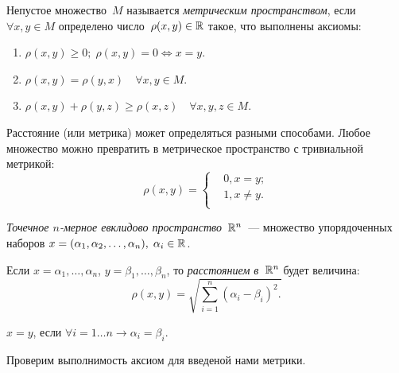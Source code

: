 \setcounter{section}{8}

\begin{definition}
Непустое множество~\(M\) называется \textit{метрическим пространством}, если \(\forall x, y \in M\)
определено число~\(\rho(x, y) \in \mathbb{R}\) такое, что выполнены аксиомы:
\begin{enumerate}
\item \(\rho(x, y) \geq 0; \; \rho(x, y) = 0 \Longleftrightarrow x = y\).
\item \(\rho(x, y) = \rho(y, x) \quad \forall x, y \in M\).
\item \(\rho(x, y) + \rho(y, z) \geq \rho(x, z) \quad \forall x, y, z \in M\).
\end{enumerate}
\end{definition}

\begin{note}
Расстояние (или метрика) может определяться разными способами. Любое множество можно превратить в
метрическое пространство с тривиальной метрикой:
\[
    \rho(x, y) = \left\{
        \begin{aligned}
            & 0, x = y;\\
            & 1, x \neq y.\\
        \end{aligned}
    \right .\]
\end{note}

\begin{definition}
\textit{Точечное \(n\)-мерное евклидово пространство~\(\mathbb{R}^n\)}~--- множество упорядоченных наборов
\(x = (\alpha_1, \alpha_2, \dots, \alpha_n), \; \alpha_i \in \mathbb{R}\).
\end{definition}

\begin{definition}
Если \(x = \alpha_1, \dots, \alpha_n\), \(y = \beta_1, \dots, \beta_n\), то \textit{расстоянием
в~\(\mathbb{R}^n\)} будет величина:
\[
    \rho(x, y) = \sqrt{\sum_{i=1}^n (\alpha_i - \beta_i)^2.}
\]
\end{definition}

\begin{definition}
\(x = y\), если \(\forall i = 1 \dots n \rightarrow \alpha_i = \beta_i\).
\end{definition}

Проверим выполнимость аксиом для введеной нами метрики.

